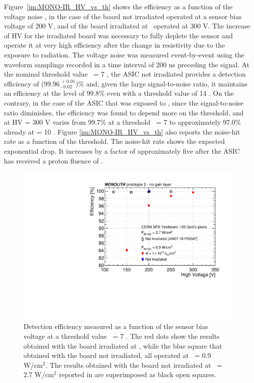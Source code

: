 		Figure~\ref{im:MONO-IR_HV_vs_th} shows the efficiency as a function of the voltage noise \noise, in the case of the board not irradiated operated at a sensor bias voltage of 200 V, and of the board irradiated at \maxflu~operated at 300 V. 
		The increase of HV for the irradiated board was necessary to fully deplete the sensor and operate it at very high efficiency after the change in resistivity due to the exposure to radiation.
		The voltage noise \noise was measured event-by-event using the waveform samplings recorded in a time interval of 200 ns preceding the signal.
		At the nominal threshold value \vth~= 7 \noise, the ASIC not irradiated provides a detection efficiency of (99.96$^{~\!+0.01}_{-0.02}$)\% and, given the large signal-to-noise ratio, it maintains an efficiency at the level of 99.8\% even with a threshold value of 14 \noise.
		On the contrary, in the case of the ASIC that was exposed to \maxflu, since the signal-to-noise ratio diminishes, the efficiency was found to depend more on the threshold, and at HV = 300 V varies from 99.7\% at a threshold \vth~= 7 \noise to approximately 97.0\% already at \vth = 10 \noise. 
		Figure \ref{im:MONO-IR_HV_vs_th} also reports the noise-hit rate as a function of the threshold. The noise-hit rate shows the expected exponential drop. It increases by a factor of approximately five after the ASIC has received a proton fluence of \maxflu.
		\begin{figure}[h]
			\centering
			\includegraphics[width=.75\textwidth]{files/MONOLITH_Irradiated_paper/Voltage_efficiency}
			\caption{Detection efficiency measured as a function of the sensor bias voltage at a threshold value \vth~= 7 \noise. The red dots show the results obtained with the board irradiated at \maxflu, while the blue square that obtained with the board not irradiated, all  operated at \power~= 0.9 W/cm$^2$. The results obtained with the board not irradiated at \power~= 2.7 W/cm$^2$ reported in \cite{Monolith_20ps} are superimposed as black open squares.}
			\label{im:MONO-IR_HV_vs_eff} 
		\end{figure}




